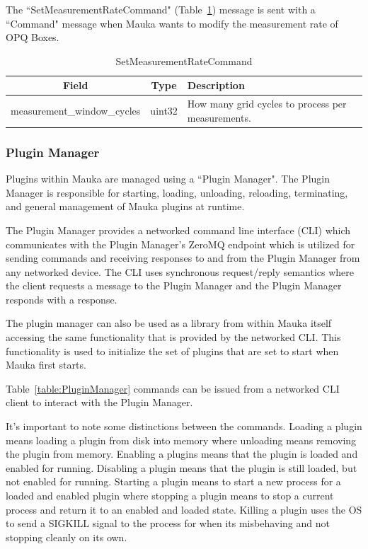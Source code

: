 The ``SetMeasurementRateCommand" (Table~\ref{table:SetMeasurementRateCommand}) message is sent with a ``Command" message when Mauka wants to modify the measurement rate of OPQ Boxes.

\begin{table}[H]
	\centering
	\caption{SetMeasurementRateCommand}
	\begin{tabular}{|c|c|p{8cm}|}
		\hline
		Field & Type & Description  \\
		\hline
		measurement\_window\_cycles & uint32 & How many grid cycles to process per measurements. \\
		\hline
	\end{tabular}
	\label{table:SetMeasurementRateCommand}
\end{table}

\subsubsection{Plugin Manager}
Plugins within Mauka are managed using a ``Plugin Manager". The Plugin Manager is responsible for starting, loading, unloading, reloading, terminating, and general management of Mauka plugins at runtime.

The Plugin Manager provides a networked command line interface (CLI) which communicates with the Plugin Manager's ZeroMQ endpoint which is utilized for sending commands and receiving responses to and from the Plugin Manager from any networked device. The CLI uses synchronous request/reply semantics where the client requests a message to the Plugin Manager and the Plugin Manager responds with a response.

The plugin manager can also be used as a library from within Mauka itself accessing the same functionality that is provided by the networked CLI. This functionality is used to initialize the set of plugins that are set to start when Mauka first starts.

Table~\ref{table:PluginManager} commands can be issued from a networked CLI client to interact with the Plugin Manager.

It's important to note some distinctions between the commands. Loading a plugin means loading a plugin from disk into memory where unloading means removing the plugin from memory. Enabling a plugins means that the plugin is loaded and enabled for running. Disabling a plugin means that the plugin is still loaded, but not enabled for running. Starting a plugin means to start a new process for a loaded and enabled plugin where stopping a plugin means to stop a current process and return it to an enabled and loaded state. Killing a plugin uses the OS to send a SIGKILL signal to the process for when its misbehaving and not stopping cleanly on its own.

